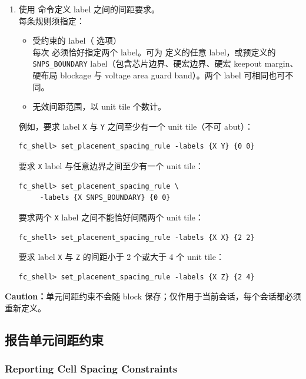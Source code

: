 \begin{enumerate}
  \item 使用  命令定义 label 之间的间距要求。\\
        每条规则须指定：
        \begin{itemize}
          \item 受约束的 label（ 选项）\\
                每次  必须恰好指定两个 label。可为  定义的任意 label，或预定义的 \texttt{SNPS\_BOUNDARY} label（包含芯片边界、硬宏边界、硬宏 keepout margin、硬布局 blockage 与 voltage area guard band）。两个 label 可相同也可不同。
          \item 无效间距范围，以 unit tile 个数计。
        \end{itemize}
        例如，要求 label \texttt{X} 与 \texttt{Y} 之间至少有一个 unit tile（不可 abut）：
\begin{lstlisting}
fc_shell> set_placement_spacing_rule -labels {X Y} {0 0}
\end{lstlisting}
        要求 \texttt{X} label 与任意边界之间至少有一个 unit tile：
\begin{lstlisting}
fc_shell> set_placement_spacing_rule \
     -labels {X SNPS_BOUNDARY} {0 0}
\end{lstlisting}
        要求两个 \texttt{X} label 之间不能恰好间隔两个 unit tile：
\begin{lstlisting}
fc_shell> set_placement_spacing_rule -labels {X X} {2 2}
\end{lstlisting}
        要求 label \texttt{X} 与 \texttt{Z} 的间距小于 2 个或大于 4 个 unit tile：
\begin{lstlisting}
fc_shell> set_placement_spacing_rule -labels {X Z} {2 4}
\end{lstlisting}
\end{enumerate}

\begin{noteBox}
\textbf{Caution：}单元间距约束不会随 block 保存；仅作用于当前会话，每个会话都必须重新定义。
\end{noteBox}

\subsection{报告单元间距约束}
\subsubsection*{Reporting Cell Spacing Constraints}

